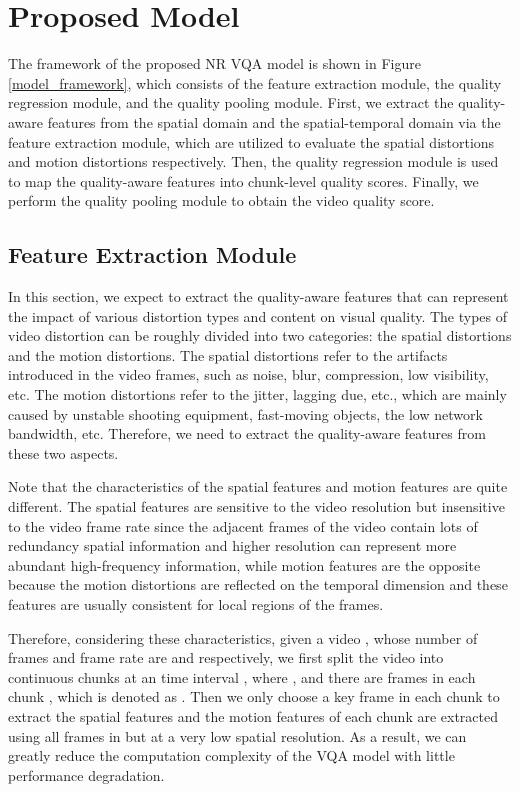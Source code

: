 \documentclass[sigconf]{acmart}
\begin{document}
\section{Proposed Model}
\label{proposed_model}

The framework of the proposed NR VQA model is shown in Figure \ref{model_framework}, which consists of the feature extraction module, the quality regression module, and the quality pooling module. First, we extract the quality-aware features from the spatial domain and the spatial-temporal domain via the feature extraction module, which are utilized to evaluate the spatial distortions and motion distortions respectively. Then, the quality regression module is used to map the quality-aware features into chunk-level quality scores. Finally, we perform the quality pooling module to obtain the video quality score.

\subsection{Feature Extraction Module}
\label{feature_extraction_module}
In this section, we expect to extract the quality-aware features that can represent the impact of various distortion types and content on visual quality. The types of video distortion can be roughly divided into two categories: the spatial distortions and the motion distortions. The spatial distortions refer to the artifacts introduced in the video frames, such as noise, blur, compression, low visibility, etc. The motion distortions refer to the jitter, lagging due, etc., which are mainly caused by unstable shooting equipment, fast-moving objects, the low network bandwidth, etc. Therefore, we need to extract the quality-aware features from these two aspects.

Note that the characteristics of the spatial features and motion features are quite different. The spatial features are sensitive to the video resolution but insensitive to the video frame rate since the adjacent frames of the video contain lots of redundancy spatial information and higher resolution can represent more abundant high-frequency information, while motion features are the opposite because the motion distortions are reflected on the temporal dimension and these features are usually consistent for local regions of the frames.

Therefore, considering these characteristics, given a video , whose number of frames and frame rate are  and  respectively, we first split the video  into  continuous chunks  at an time interval , where , and there are  frames in each chunk , which is denoted as . Then we only choose a key frame  in each chunk to extract the spatial features and the motion features of each chunk are extracted using all frames in  but at a very low spatial resolution. As a result, we can greatly reduce the computation complexity of the VQA model with little performance degradation.
\end{document}
